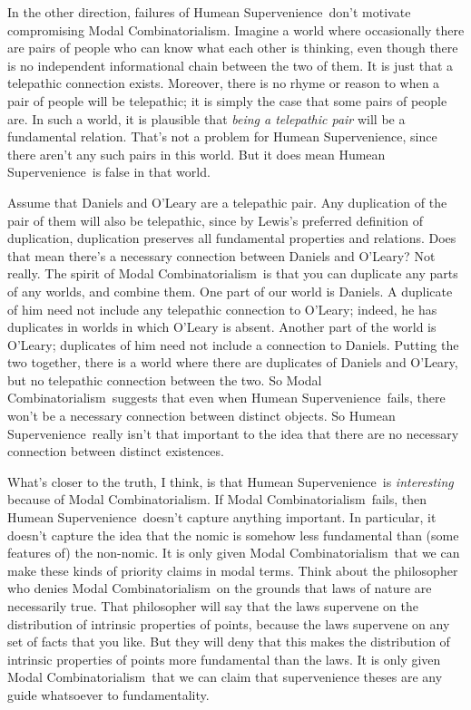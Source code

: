 \documentclass[
  10pt,
  letterpaper,
  DIV=11,
  numbers=noendperiod,
  twoside]{scrartcl}
\begin{document}
In the other direction, failures of Humean Supervenience~don't motivate
compromising Modal Combinatorialism. Imagine a world where occasionally
there are pairs of people who can know what each other is thinking, even
though there is no independent informational chain between the two of
them. It is just that a telepathic connection exists. Moreover, there is
no rhyme or reason to when a pair of people will be telepathic; it is
simply the case that some pairs of people are. In such a world, it is
plausible that \emph{being a telepathic pair} will be a fundamental
relation. That's not a problem for Humean Supervenience, since there
aren't any such pairs in this world. But it does mean Humean
Supervenience~is false in that world.

Assume that Daniels and O'Leary are a telepathic pair. Any duplication
of the pair of them will also be telepathic, since by Lewis's preferred
definition of duplication, duplication preserves all fundamental
properties and relations. Does that mean there's a necessary connection
between Daniels and O'Leary? Not really. The spirit of Modal
Combinatorialism~is that you can duplicate any parts of any worlds, and
combine them. One part of our world is Daniels. A duplicate of him need
not include any telepathic connection to O'Leary; indeed, he has
duplicates in worlds in which O'Leary is absent. Another part of the
world is O'Leary; duplicates of him need not include a connection to
Daniels. Putting the two together, there is a world where there are
duplicates of Daniels and O'Leary, but no telepathic connection between
the two. So Modal Combinatorialism~suggests that even when Humean
Supervenience~fails, there won't be a necessary connection between
distinct objects. So Humean Supervenience~really isn't that important to
the idea that there are no necessary connection between distinct
existences.

What's closer to the truth, I think, is that Humean Supervenience~is
\emph{interesting} because of Modal Combinatorialism. If Modal
Combinatorialism~fails, then Humean Supervenience~doesn't capture
anything important. In particular, it doesn't capture the idea that the
nomic is somehow less fundamental than (some features of) the non-nomic.
It is only given Modal Combinatorialism~that we can make these kinds of
priority claims in modal terms. Think about the philosopher who denies
Modal Combinatorialism~on the grounds that laws of nature are
necessarily true. That philosopher will say that the laws supervene on
the distribution of intrinsic properties of points, because the laws
supervene on any set of facts that you like. But they will deny that
this makes the distribution of intrinsic properties of points more
fundamental than the laws. It is only given Modal Combinatorialism~that
we can claim that supervenience theses are any guide whatsoever to
fundamentality.
\end{document}
